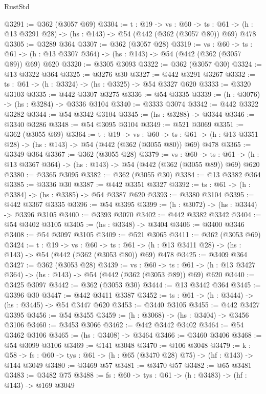 \begin{lexlean}{RustStd}
\begin{coremodule}
@3291 := @362 (@3057 @69)
@3304 := {t : @19} ->
  {vs : @60} ->
  {ts : @61} -> (h : @13 @3291 @28) -> (hs : @143) -> @54 (@442 (@362 (@3057 @80)) @69) @478
@3305 := @3289 @364
@3307 := @362 (@3057 @28)
@3319 := {vs : @60} ->
  {ts : @61} -> (h : @13 @3307 @364) -> (hs : @143) -> @54 (@442 (@362 (@3057 @89)) @69) @620
@3320 := @3305 @3093
@3322 := @362 (@3057 @30)
@3324 := @13 @3322 @364
@3325 := @3276 @30
@3327 := @442 @3291 @3267
@3332 := {ts : @61} -> (h : @3324) -> (hs : @3325) -> @54 @3327 @620
@3333 := @3320 @3103
@3335 := @442 @3307 @3275
@3336 := @54 @3335
@3339 := (h : @3076) -> (hs : @3284) -> @3336 @3104
@3340 := @3333 @3074
@3342 := @442 @3322 @3282
@3344 := @54 @3342 @3104
@3345 := (hs : @3288) -> @3344
@3346 := @3340 @3286
@3348 := @54 @3095 @3104
@3349 := @521 @3069
@3351 := @362 (@3055 @69)
@3364 := {t : @19} ->
  {vs : @60} ->
  {ts : @61} -> (h : @13 @3351 @28) -> (hs : @143) -> @54 (@442 (@362 (@3055 @80)) @69) @478
@3365 := @3349 @364
@3367 := @362 (@3055 @28)
@3379 := {vs : @60} ->
  {ts : @61} -> (h : @13 @3367 @364) -> (hs : @143) -> @54 (@442 (@362 (@3055 @89)) @69) @620
@3380 := @3365 @3095
@3382 := @362 (@3055 @30)
@3384 := @13 @3382 @364
@3385 := @3336 @30
@3387 := @442 @3351 @3327
@3392 := {ts : @61} -> (h : @3384) -> (hs : @3385) -> @54 @3387 @620
@3393 := @3380 @3104
@3395 := @442 @3367 @3335
@3396 := @54 @3395
@3399 := (h : @3072) -> (hs : @3344) -> @3396 @3105
@3400 := @3393 @3070
@3402 := @442 @3382 @3342
@3404 := @54 @3402 @3105
@3405 := (hs : @3348) -> @3404
@3406 := @3400 @3346
@3408 := @54 @3097 @3105
@3409 := @521 @3065
@3411 := @362 (@3053 @69)
@3424 := {t : @19} ->
  {vs : @60} ->
  {ts : @61} -> (h : @13 @3411 @28) -> (hs : @143) -> @54 (@442 (@362 (@3053 @80)) @69) @478
@3425 := @3409 @364
@3427 := @362 (@3053 @28)
@3439 := {vs : @60} ->
  {ts : @61} -> (h : @13 @3427 @364) -> (hs : @143) -> @54 (@442 (@362 (@3053 @89)) @69) @620
@3440 := @3425 @3097
@3442 := @362 (@3053 @30)
@3444 := @13 @3442 @364
@3445 := @3396 @30
@3447 := @442 @3411 @3387
@3452 := {ts : @61} -> (h : @3444) -> (hs : @3445) -> @54 @3447 @620
@3453 := @3440 @3105
@3455 := @442 @3427 @3395
@3456 := @54 @3455
@3459 := (h : @3068) -> (hs : @3404) -> @3456 @3106
@3460 := @3453 @3066
@3462 := @442 @3442 @3402
@3464 := @54 @3462 @3106
@3465 := (hs : @3408) -> @3464
@3466 := @3460 @3406
@3468 := @54 @3099 @3106
@3469 := @141 @3048
@3470 := @106 @3048
@3479 := {k : @58} ->
  {fs : @60} -> {tys : @61} -> (h : @65 (@3470 @28) @75) -> (hf : @143) -> @144 @3049
@3480 := @3469 @57
@3481 := @3470 @57
@3482 := @65 @3481
@3483 := @3482 @75
@3488 := {fs : @60} -> {tys : @61} -> (h : @3483) -> (hf : @143) -> @169 @3049

\end{coremodule}
\end{lexlean}
